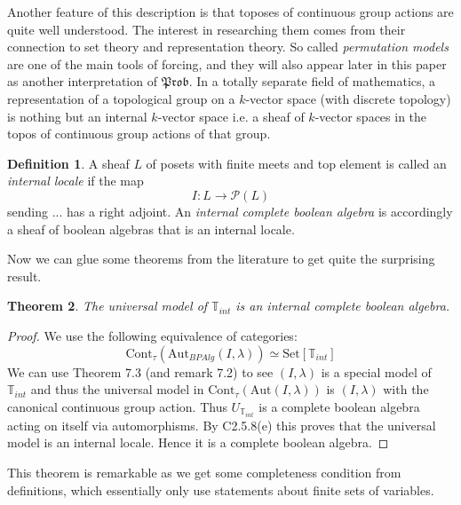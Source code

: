 \documentclass[a4paper]{amsproc}
\theoremstyle{plain}
\newtheorem{theorem}{Theorem}[section]
\theoremstyle{definition}
\newtheorem{definition}[theorem]{Definition}
\theoremstyle{remark}
\numberwithin{equation}{section}
\begin{document}
Another feature of this description is that toposes of continuous group actions are quite well understood. The interest in researching them comes from their connection to set theory and representation theory. So called \emph{permutation models} are one of the main tools of forcing, and they will also appear later in this paper as another interpretation of $\mathfrak{Prob}$. In a totally separate field of mathematics, a representation of a topological group on a $k$-vector space (with discrete topology) is nothing but an internal $k$-vector space \cite{XYZ} i.e. a sheaf of $k$-vector spaces in the topos of continuous group actions of that group.
\begin{definition} A sheaf $L$ of posets with finite meets and top element is called an \emph{internal locale} if the map 
\[I: L\rightarrow \mathcal{P}(L) \]
sending ... has a right adjoint. An \emph{internal complete boolean algebra} is accordingly a sheaf of boolean algebras that is an internal locale.
\end{definition}
Now we can glue some theorems from the literature to get quite the surprising result.
\begin{theorem} The universal model of $\mathbb{T}_{int}$ is an internal complete boolean algebra.
\end{theorem}
\begin{proof} 
We use the following equivalence of categories:
\[ \text{Cont}_\tau(\text{Aut}_{BPAlg}(I,\lambda))\simeq \text{Set}[\mathbb{T}_{int}]  \]
We can use Theorem 7.3 (and remark 7.2) \cite{caramello_lafforgue} %
 to see $(I,\lambda)$ is a special model of $\mathbb{T}_{int}$ and thus the universal model in $\text{Cont}_\tau(\text{Aut}(I,\lambda))$ is $(I,\lambda)$ with the canonical continuous group action.\newline 
\indent Thus $U_{\mathbb{T}_{int}}$ is a complete boolean algebra acting on itself via automorphisms.  By C2.5.8(e) \cite{elephant} this proves that the universal model is an internal locale. Hence it is a complete boolean algebra.
\end{proof}
This theorem is remarkable as we get some completeness condition from definitions, which essentially only use statements about finite sets of variables.
\end{document}
